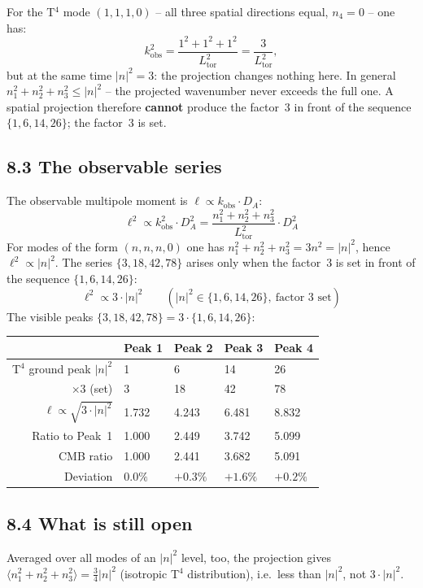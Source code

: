 For the T$^4$ mode $(1,1,1,0)$ -- all three spatial directions
equal, $n_4 = 0$ -- one has:
\[
  k_\mathrm{obs}^2 = \frac{1^2+1^2+1^2}{L_\mathrm{tor}^2}
  = \frac{3}{L_\mathrm{tor}^2},
\]
but at the same time $|n|^2 = 3$: the projection changes nothing here.
In general $n_1^2+n_2^2+n_3^2 \le |n|^2$ -- the projected wavenumber never
exceeds the full one. A spatial projection therefore \textbf{cannot} produce
the factor~3 in front of the sequence $\{1,6,14,26\}$; the factor~3 is set.

\subsection*{8.3 The observable series}

The observable multipole moment is
$\ell \propto k_\mathrm{obs} \cdot D_A$:
\[
  \ell^2 \propto k_\mathrm{obs}^2 \cdot D_A^2
  = \frac{n_1^2+n_2^2+n_3^2}{L_\mathrm{tor}^2} \cdot D_A^2
\]
For modes of the form $(n,n,n,0)$ one has $n_1^2+n_2^2+n_3^2=3n^2=|n|^2$,
hence $\ell^2\propto|n|^2$. The series $\{3,18,42,78\}$ arises only when the
factor~3 is set in front of the sequence $\{1,6,14,26\}$:
\[
  \ell^2 \propto 3 \cdot |n|^2 \qquad (|n|^2 \in \{1,6,14,26\},\ \text{factor~3 set})
\]
The visible peaks $\{3, 18, 42, 78\} = 3\cdot\{1, 6, 14, 26\}$:

\begin{center}
\begin{tabular}{rllll}
\toprule
 & Peak 1 & Peak 2 & Peak 3 & Peak 4 \\
\midrule
T$^4$ ground peak $|n|^2$ & 1 & 6 & 14 & 26 \\
$\times 3$ (set) & 3 & 18 & 42 & 78 \\
$\ell \propto \sqrt{3\cdot|n|^2}$ & 1{.}732 & 4{.}243 & 6{.}481 & 8{.}832 \\
Ratio to Peak~1 & 1{.}000 & 2{.}449 & 3{.}742 & 5{.}099 \\
CMB ratio & 1{.}000 & 2{.}441 & 3{.}682 & 5{.}091 \\
Deviation & $0{.}0\%$ & $+0{.}3\%$ & $+1{.}6\%$ & $+0{.}2\%$ \\
\bottomrule
\end{tabular}
\end{center}

\subsection*{8.4 What is still open}

Averaged over all modes of an $|n|^2$ level, too, the projection gives
$\langle n_1^2+n_2^2+n_3^2\rangle = \tfrac{3}{4}|n|^2$ (isotropic T$^4$
distribution), i.e.\ less than $|n|^2$, not $3\cdot|n|^2$.

